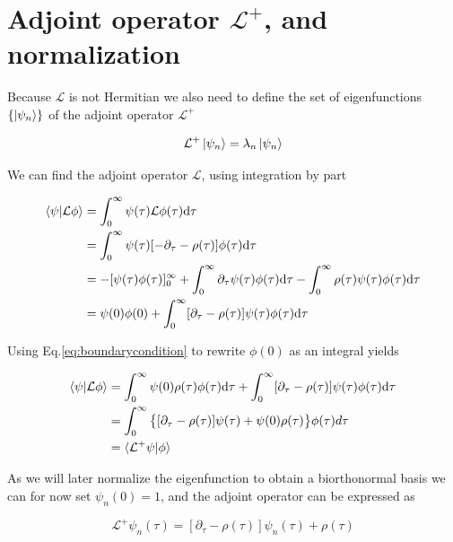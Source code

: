 \documentclass[12pt,twoside]{report}
\def \dd  {{\rm d}}
\begin{document}
\section{Adjoint operator $\mathcal{L}^+$, and normalization}
\label{sec:adop}

Because $\mathcal{L}$ is not Hermitian we also need to define the set of eigenfunctions $\{\ket{\psi_n}\}$ of the adjoint operator $\mathcal{L}^{+}$

\begin{equation}
\label{eq:Ldegaoperator}
\mathcal{L}^+\ket{\psi_n}=\lambda_n\ket{\psi_n}
\end{equation}

We can find the adjoint operator $\mathcal{L}$, using integration by part

\begin{align}
\langle\psi|\mathcal{L}\phi\rangle&= \int_{0}^{\infty}\psi(\tau)\mathcal{L}\phi(\tau)\dd\tau  \nonumber \\
&= \int_{0}^{\infty}\psi(\tau)[-\partial_{\tau}-\rho(\tau)]\phi(\tau)\dd\tau  \nonumber \\
&=-[\psi(\tau)\phi(\tau)]^{\infty}_{0}+\int_{0}^{\infty}\partial_{\tau}\psi(\tau)\phi(\tau)\dd\tau -\int_{0}^{\infty}\rho(\tau)\psi(\tau)\phi(\tau)\dd\tau \nonumber \\
&= \psi(0)\phi(0)+ \int_{0}^{\infty}[\partial_{\tau}-\rho(\tau)]\psi(\tau)\phi(\tau)\dd\tau  \nonumber \\
\end{align}

Using Eq.\eqref{eq:boundarycondition} to rewrite $\phi(0)$ as an integral yields

\begin{align}
\langle\psi|\mathcal{L}\phi\rangle&=\int_{0}^{\infty} \psi(0)\rho(\tau)\phi(\tau)\dd\tau+ \int_{0}^{\infty}[\partial_{\tau}-\rho(\tau)]\psi(\tau)\phi(\tau)\dd\tau  \nonumber \\
&= \int_{0}^{\infty}\big\{[\partial_{\tau}-\rho(\tau)]\psi(\tau)+ \psi(0)\rho(\tau)\big\}\phi(\tau)d\tau  \nonumber \\
& = \langle\mathcal{L}^+\psi|\phi\rangle
\end{align}

As we will later normalize the eigenfunction to obtain a biorthonormal basis we can for now set $\psi_n(0)=1$, and the adjoint operator can be expressed as

\begin{equation}
\label{eq:Ldega}
\mathcal{L}^+\psi_n(\tau)=[\partial_{\tau}-\rho(\tau)]\psi_n(\tau)+\rho(\tau)
\end{equation}
\end{document}
